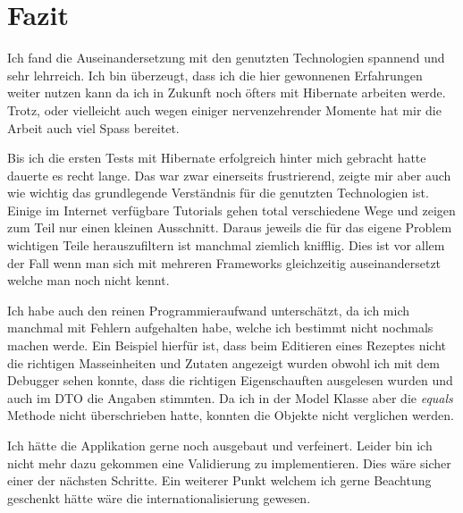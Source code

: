 \chapter{Fazit}
\label{chap:Fazit}

Ich fand die Auseinandersetzung mit den genutzten Technologien spannend und sehr lehrreich. Ich bin überzeugt, dass ich die hier gewonnenen Erfahrungen weiter nutzen kann da ich in Zukunft noch öfters mit Hibernate arbeiten werde. Trotz, oder vielleicht auch wegen einiger nervenzehrender Momente hat mir die Arbeit auch viel Spass bereitet.

Bis ich die ersten Tests mit Hibernate erfolgreich hinter mich gebracht hatte dauerte es recht lange. Das war zwar einerseits frustrierend, zeigte mir aber auch wie wichtig das grundlegende Verständnis für die genutzten Technologien ist. Einige im Internet verfügbare Tutorials gehen total verschiedene Wege und zeigen zum Teil nur einen kleinen Ausschnitt. Daraus jeweils die für das eigene Problem wichtigen Teile herauszufiltern ist manchmal ziemlich knifflig. Dies ist vor allem der Fall wenn man sich mit mehreren Frameworks gleichzeitig auseinandersetzt welche man noch nicht kennt.

Ich habe auch den reinen Programmieraufwand unterschätzt, da ich mich manchmal mit Fehlern aufgehalten habe, welche ich bestimmt nicht nochmals machen werde. Ein Beispiel hierfür ist, dass beim Editieren eines Rezeptes nicht die richtigen Masseinheiten und Zutaten angezeigt wurden obwohl ich mit dem Debugger sehen konnte, dass die richtigen Eigenschauften ausgelesen wurden und auch im DTO die Angaben stimmten. Da ich in der Model Klasse aber die \emph{equals\(\)} Methode nicht überschrieben hatte, konnten die Objekte nicht verglichen werden.

Ich hätte die Applikation gerne noch ausgebaut und verfeinert. Leider bin ich nicht mehr dazu gekommen eine Validierung zu implementieren. Dies wäre sicher einer der nächsten Schritte. Ein weiterer Punkt welchem ich gerne Beachtung geschenkt hätte wäre die internationalisierung gewesen.